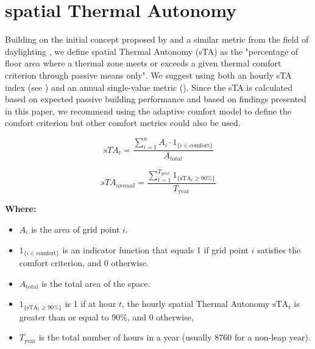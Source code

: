 
\section{spatial Thermal Autonomy}
\label{sec:sta}


Building on the initial concept proposed by \citet{levitt_thermal_2013} and a similar metric from the field of daylighting \citep{heschong_approved_2012}, we define spatial Thermal Autonomy (sTA) as the "percentage of floor area where a thermal zone meets or exceeds a given thermal comfort criterion through passive means only". We suggest using both an hourly sTA index (see ) and an annual single-value metric (). Since the sTA is calculated based on expected passive building performance and based on findings presented in this paper, we recommend using the adaptive comfort model to define the comfort criterion but other comfort metrics could also be used. 

\begin{equation}\label{eq:sta-hourly}
sTA_{t} = \frac{\sum_{i=1}^{n} A_i \cdot {1}_{\{i \in \text{comfort}\}}}{A_{total}}
\end{equation}


\begin{equation}\label{eq:sta-annual}
sTA_{annual} = \frac{\sum_{t=1}^{T_{year}} {1}_{\{\text{sTA}_t \geq 90\%\}}}{T_{\text{year}}}
\end{equation}

\vspace{0.5cm}


\textbf{Where:}
\begin{itemize}
    \item $A_i$ is the area of grid point $i$.
    \item $1_{\{i \in \text{comfort}\}}$ is an indicator function that equals 1 if grid point $i$ satisfies the comfort criterion, and 0 otherwise.
    \item $A_{\text{total}}$ is the total area of the space.
    \item $1_{\{\text{sTA}_t \geq 90\%\}}$ is 1 if at hour $t$, the hourly spatial Thermal Autonomy $\text{sTA}_t$ is greater than or equal to 90\%, and 0 otherwise,
    \item $T_{\text{year}}$ is the total number of hours in a year (usually 8760 for a non-leap year).
\end{itemize}

